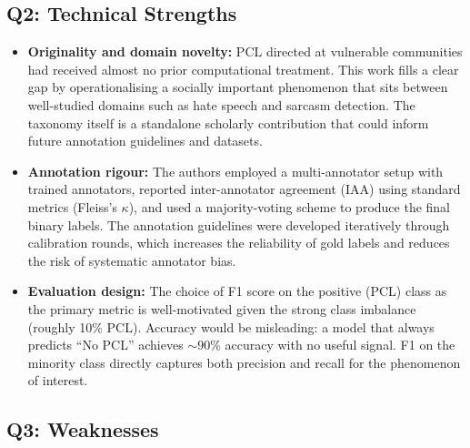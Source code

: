 \documentclass[11pt]{article}
\begin{document}
\subsection{Q2: Technical Strengths}

\begin{itemize}
    \item \textbf{Originality and domain novelty:} PCL directed at vulnerable communities had received almost no prior computational treatment. This work fills a clear gap by operationalising a socially important phenomenon that sits between well-studied domains such as hate speech and sarcasm detection. The taxonomy itself is a standalone scholarly contribution that could inform future annotation guidelines and datasets.

    \item \textbf{Annotation rigour:} The authors employed a multi-annotator setup with trained annotators, reported inter-annotator agreement (IAA) using standard metrics (Fleiss's $\kappa$), and used a majority-voting scheme to produce the final binary labels. The annotation guidelines were developed iteratively through calibration rounds, which increases the reliability of gold labels and reduces the risk of systematic annotator bias.

    \item \textbf{Evaluation design:} The choice of F1 score on the positive (PCL) class as the primary metric is well-motivated given the strong class imbalance (roughly 10\% PCL). Accuracy would be misleading: a model that always predicts ``No PCL'' achieves $\sim$90\% accuracy with no useful signal. F1 on the minority class directly captures both precision and recall for the phenomenon of interest.
\end{itemize}

\subsection{Q3: Weaknesses}
\end{document}
